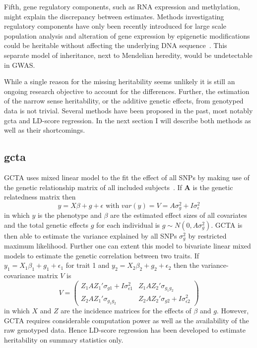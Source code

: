 Fifth, gene regulatory components, such as RNA expression and methylation, might explain the discrepancy between estimates.
Methods investigating regulatory components have only been recently introduced for large scale population analysis and alteration of gene expression by epigenetic modifications could be heritable without affecting the underlying DNA sequence~\cite{Trerotola2015}.
This separate model of inheritance, next to Mendelian heredity, would be undetectable in GWAS\@.

While a single reason for the missing heritability seems unlikely it is still an ongoing research objective to account for the differences.
Further, the estimation of the narrow sense heritability, or the additive genetic effects, from genotyped data is not trivial.
Several methods have been proposed in the past, most notably \acrfull{gcta} and LD-score regression.
In the next section I will describe both methods as well as their shortcomings.

\subsection{\acrfull{gcta}}
\label{sub:gcta}

GCTA uses mixed linear model to the fit the effect of all SNPs by making use of the genetic relationship matrix of all included subjects~\cite{Yang2011}.
If $\textbf{A}$ is the genetic relatedness matrix then
\begin{equation}
  y = X\beta + g + \epsilon \text{ with } var(y) = V = A\sigma^2_g + I\sigma^2_\epsilon
\end{equation}
in which $y$ is the phenotype and $\beta$ are the estimated effect sizes of all covariates and the total genetic effects $g$ for each individual is $g \sim N(0, A\sigma^2_g)$.
GCTA is then able to estimate the variance explained by all SNPs $\sigma^2_g$ by restricted maximum likelihood.
Further one can extent this model to bivariate linear mixed models to estimate the genetic correlation between two traits.
If $y_1 = X_1\beta_1 + g_1 + \epsilon_1$ for trait 1 and $y_2= X_2\beta_2 + g_2 + \epsilon_2$ then the variance-covariance matrix $V$ is
\begin{equation}
  V = 
  \begin{pmatrix}
    Z_1AZ_1'\sigma_{g1} + I\sigma^2_{\epsilon 1} & Z_1AZ_2'\sigma_{g_1g_2} \\
    Z_2AZ_1'\sigma_{g_1g_2} & Z_2AZ_2'\sigma_{g2} + I\sigma^2_{\epsilon 2}
  \end{pmatrix}
\end{equation}
in which $X$ and $Z$ are the incidence matrices for the effects of $\beta$ and $g$.
However, GCTA requires considerable computation power as well as the availability of the raw genotyped data.
Hence LD-score regression has been developed to estimate heritability on summary statistics only.

